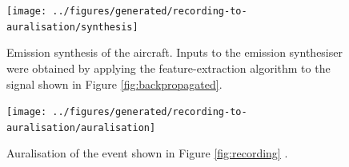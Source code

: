 \newpage
\begin{figure}[H]
  \centering
  \texttt{[image: ../figures/generated/recording-to-auralisation/synthesis]}
  \caption{Emission synthesis of the aircraft. Inputs to the emission synthesiser were obtained by applying the feature-extraction algorithm to the signal shown in Figure \ref{fig:backpropagated}.}
  \label{fig:synthesis}
\end{figure}


\begin{figure}[H]
  \centering
  \texttt{[image: ../figures/generated/recording-to-auralisation/auralisation]}
  \caption{Auralisation of the event shown in Figure \ref{fig:recording} .
  }
  \label{fig:auralisation}
\end{figure}
